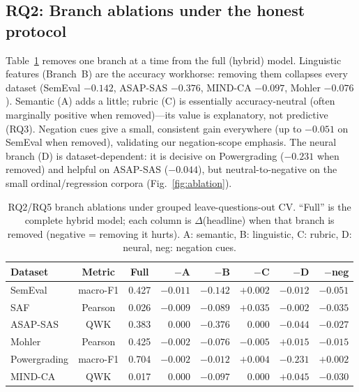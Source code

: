\documentclass[10pt,twocolumn]{article}
\begin{document}
\subsection{RQ2: Branch ablations under the honest protocol}
Table~\ref{tab:ablations} removes one branch at a time from the full (hybrid)
model. Linguistic features (Branch~B) are the accuracy workhorse: removing them
collapses every dataset (SemEval $-0.142$, ASAP-SAS $-0.376$, MIND-CA $-0.097$,
Mohler $-0.076$). Semantic (A) adds a little; rubric (C) is essentially
accuracy-neutral (often marginally positive when removed)---its value is
explanatory, not predictive (RQ3). Negation cues give a small, consistent gain
everywhere (up to $-0.051$ on SemEval when removed), validating our negation-scope
emphasis. The neural branch (D) is dataset-dependent: it is decisive on
Powergrading ($-0.231$ when removed) and helpful on ASAP-SAS ($-0.044$), but
neutral-to-negative on the small ordinal/regression corpora
(Fig.~\ref{fig:ablation}).

\begin{table}[t]
\centering\small
\caption{RQ2/RQ5 branch ablations under grouped leave-questions-out CV.
``Full'' is the complete hybrid model; each column is $\Delta$(headline) when that
branch is removed (negative = removing it hurts). A: semantic, B: linguistic,
C: rubric, D: neural, neg: negation cues.}
\label{tab:ablations}
\begin{tabular}{@{}lccrrrrr@{}}
\toprule
Dataset & Metric & Full & $-$A & $-$B & $-$C & $-$D & $-$neg\\
\midrule
SemEval      & macro-F1 & 0.427 & $-0.011$ & $\mathbf{-0.142}$ & $+0.002$ & $-0.012$ & $-0.051$\\
SAF          & Pearson  & 0.026 & $-0.009$ & $-0.089$ & $+0.035$ & $-0.002$ & $-0.035$\\
ASAP-SAS     & QWK      & 0.383 & $\ \ 0.000$ & $\mathbf{-0.376}$ & $\ \ 0.000$ & $-0.044$ & $-0.027$\\
Mohler       & Pearson  & 0.425 & $-0.002$ & $-0.076$ & $-0.005$ & $+0.015$ & $-0.015$\\
Powergrading & macro-F1 & 0.704 & $-0.002$ & $-0.012$ & $+0.004$ & $\mathbf{-0.231}$ & $+0.002$\\
MIND-CA      & QWK      & 0.017 & $\ \ 0.000$ & $-0.097$ & $\ \ 0.000$ & $+0.045$ & $-0.030$\\
\bottomrule
\end{tabular}
\end{table}
\end{document}
